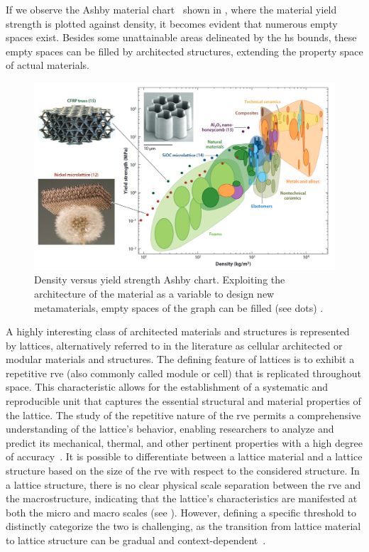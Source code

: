 If we observe the Ashby material chart~ shown in , where the material yield strength is plotted against density, it becomes evident that numerous empty spaces exist. Besides some unattainable areas delineated by the \gls{hs} bounds, these empty spaces can be filled by architected structures, extending the property space of actual materials.
\begin{figure}
    \centering
    \includegraphics[width=\linewidth]{figures/02_literature/ashby_chart.png}
    \caption{Density versus yield strength Ashby chart. Exploiting the architecture of the material as a variable to design new metamaterials, empty spaces of the graph can be filled (see dots) \cite{schaedler_architected_2016}.}
    \label{fig:02_ashby_ch}
\end{figure}

A highly interesting class of architected materials and structures is represented by lattices, alternatively referred to in the literature as cellular architected or modular materials and structures. The defining feature of lattices is to exhibit a repetitive \gls{rve} (also commonly called module or cell) that is replicated throughout space. This characteristic allows for the establishment of a systematic and reproducible unit that captures the essential structural and material properties of the lattice. The study of the repetitive nature of the \gls{rve} permits a comprehensive understanding of the lattice's behavior, enabling researchers to analyze and predict its mechanical, thermal, and other pertinent properties with a high degree of accuracy~. It is possible to differentiate between a lattice material and a lattice structure based on the size of the \gls{rve} with respect to the considered structure. In a lattice structure, there is no clear physical scale separation between the \gls{rve} and the macrostructure, indicating that the lattice's characteristics are manifested at both the micro and macro scales (see ). However, defining a specific threshold to distinctly categorize the two is challenging, as the transition from lattice material to lattice structure can be gradual and context-dependent~.

